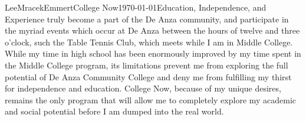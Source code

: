 \documentclass[a4paper]{article}
\begin{document}
\begin{mla}{Lee}{Mracek}{Emmert}{College Now}{\today}{Education, Independence,
    and Experience}
    truly become a part of the De Anza community, and participate in the myriad events which occur at De Anza between the hours of twelve and three o'clock, such the Table Tennis Club, which meets while I am in Middle College. \\
    While my time in high school has been enormously improved by my time spent in the Middle College program, its limitations prevent me from exploring the full potential of De Anza Community College and deny me from fulfilling my thirst for independence and education. College Now, because of my unique desires, remains the only program that will allow me to completely explore my academic and social potential before I am dumped into the real world.
\end{mla}
\end{document}
